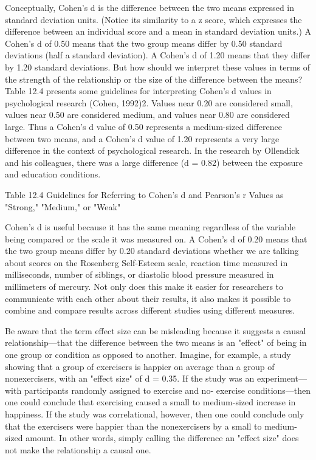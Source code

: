  Conceptually, Cohen's d is the difference between the two means expressed in standard deviation units. (Notice its similarity to a z score, which expresses the difference between an individual score and a mean in standard deviation units.) A Cohen's d of 0.50 means that the two group means differ by 0.50 standard deviations (half a standard deviation). A Cohen's d of 1.20 means that they differ by 1.20 standard deviations. But how should we interpret these values in terms of the strength of the relationship or the size of the difference between the means? Table 12.4 presents some guidelines for interpreting Cohen's d values in psychological research (Cohen, 1992)2. Values near 0.20 are considered small, values near 0.50 are considered medium, and values near 0.80 are considered large. Thus a Cohen's d value of 0.50 represents a medium-sized difference between two means, and a Cohen's d value of 1.20 represents a very large difference in the context of psychological research. In the research by Ollendick and his colleagues, there was a large difference (d = 0.82) between the exposure and education conditions.


Table 12.4 Guidelines for Referring to Cohen's d and Pearson's r Values as "Strong," "Medium," or "Weak"

Cohen's d is useful because it has the same meaning regardless of the variable being compared or the scale it was measured on. A Cohen's d of 0.20 means that the two group means differ by 0.20 standard deviations whether we are talking about scores on the Rosenberg Self-Esteem scale, reaction time measured in milliseconds, number of siblings, or diastolic blood pressure measured in millimeters of mercury. Not only does this make it easier for researchers to communicate with each other about their results, it also makes it possible to combine and compare results across different studies using different measures.


Be aware that the term effect size can be misleading because it suggests a causal relationship---that the difference between the two means is an "effect" of being in one group or condition as opposed to another. Imagine, for example, a study showing that a group of exercisers is happier on average than a group of nonexercisers, with an "effect size" of d = 0.35. If the study was an experiment---with participants randomly assigned to exercise and no- exercise conditions---then one could conclude that exercising caused a small to medium-sized increase in happiness. If the study was correlational, however, then one could conclude only that the exercisers were happier than the nonexercisers by a small to medium-sized amount. In other words, simply calling the difference an "effect size" does not make the relationship a causal one.


